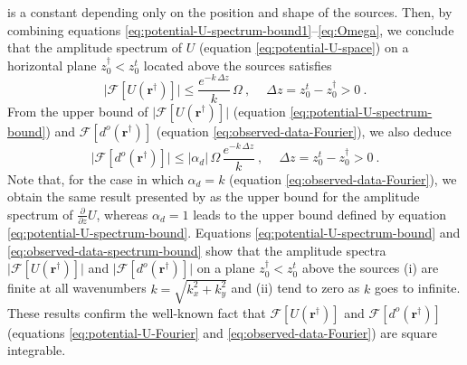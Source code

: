 is a constant depending only on the position and shape of the sources. 
Then, by combining equations 
\ref{eq:potential-U-spectrum-bound1}--\ref{eq:Omega},
we conclude that the amplitude spectrum of 
$U$ (equation \ref{eq:potential-U-space}) on a horizontal plane 
$z^{\dagger}_{0} < z^{t}_{0}$ located above the sources satisfies 
\begin{equation}
	\vert \mathcal{F} [ U(\mathbf{r}^{\dagger}) ] \vert \le
	\frac{e^{- k \, \Delta z}}{k} \, \Omega \: ,
	\: \quad \Delta z = z^{t}_{0} - z^{\dagger}_{0} > 0 \: .
	\label{eq:potential-U-spectrum-bound}
\end{equation}
From the upper bound of $\vert \mathcal{F} [ U(\mathbf{r}^{\dagger}) ] \vert$
(equation \ref{eq:potential-U-spectrum-bound}) and $\mathcal{F} [ d^{o}(\mathbf{r}^{\dagger}) ]$
(equation \ref{eq:observed-data-Fourier}), we also deduce
\begin{equation}
	\vert \mathcal{F} [ d^{o}(\mathbf{r}^{\dagger}) ] \vert \le
	\vert \alpha_{d} \vert \, \Omega \, 
	\frac{e^{- k \, \Delta z}}{k} \: ,
	\: \quad \Delta z = z^{t}_{0} - z^{\dagger}_{0} > 0 \: .
	\label{eq:observed-data-spectrum-bound}
\end{equation}
Note that, for the case in which $\alpha_{d} = k$ (equation \ref{eq:observed-data-Fourier}), 
we obtain the same result presented by  as the upper bound for the 
amplitude spectrum of $\tfrac{\partial}{\partial z} U$, whereas
$\alpha_{d} = 1$ leads to the upper bound defined by equation \ref{eq:potential-U-spectrum-bound}.
Equations \ref{eq:potential-U-spectrum-bound} and \ref{eq:observed-data-spectrum-bound} 
show that the amplitude spectra 
$\vert \mathcal{F} [ U(\mathbf{r}^{\dagger}) ] \vert$ and 
$\vert \mathcal{F} [ d^{o}(\mathbf{r}^{\dagger}) ] \vert$ on a plane $z^{\dagger}_{0} < z^{t}_{0}$ 
above the sources 
(i) are finite at all wavenumbers $k = \sqrt{k_{x}^{2} + k_{y}^{2}}$ and (ii) tend
to zero as $k$ goes to infinite.
These results confirm the well-known fact that 
$\mathcal{F} [ U(\mathbf{r}^{\dagger}) ]$ and $\mathcal{F} [ d^{o}(\mathbf{r}^{\dagger}) ]$ 
(equations \ref{eq:potential-U-Fourier} and \ref{eq:observed-data-Fourier}) are square integrable.